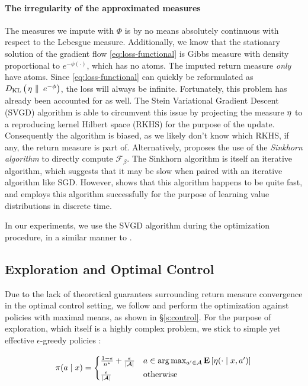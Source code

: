 \paragraph{The irregularity of the approximated measures}
The measures we impute with $\Phi$ is by no means absolutely
continuous with respect to the Lebesgue measure. Additionally, we know
that the stationary solution of the gradient flow
\eqref{eq:loss-functional} is Gibbs measure with density proportional
to $e^{-\phi(\cdot)}$, which has no atoms. The imputed return measure
\emph{only} have atoms. Since \eqref{eq:loss-functional} can quickly
be reformulated as $D_{\text{KL}}\left(\left. \operatorname{\eta}\ \right\|\ e^{-\phi}\right)$, the loss will
always be infinite. Fortunately, this problem has already been
accounted for as well. The Stein Variational Gradient Descent (SVGD)
algorithm \citep{liu2019stein} is able to circumvent this issue by
projecting the measure $\operatorname{\eta}$ to a reproducing kernel
Hilbert space (RKHS) for the purpose of the update. Consequently the
algorithm is biased, as we likely don't know which RKHS, if any, the
return measure is part of. Alternatively, \citet{cuturi2013sinkhorn}
proposes the use of the \emph{Sinkhorn algorithm}
\citep{sinkhorn1967diagonal} to directly compute
$\mathscr{F}_\beta$. The Sinkhorn algorithm is itself an iterative
algorithm, which suggests that it may be slow when paired with an
iterative algorithm like SGD. However, \citet{cuturi2013sinkhorn}
shows that this algorithm happens to be quite fast, and
\citet{martin2020stochastically} employs this algorithm successfully
for the purpose of learning value distributions in discrete time.

In our experiments, we use the SVGD algorithm during the optimization
procedure, in a similar manner to \citet{Zhang2018PolicyOA}.

\subsection{Exploration and Optimal
  Control}\label{s:deicide:alg:optimal-control}
Due to the lack of theoretical guarantees surrounding return measure
convergence in the optimal control setting, we follow
\citet{Bellemare2017ADP, hessel2018rainbow} and perform the
optimization against policies with maximal means, as shown in
\S\ref{s:control}. For the purpose of exploration, which itself is a
highly complex problem, we stick to simple yet effective
$\epsilon$-greedy policies \citep{sutton2018reinforcement}:

\begin{equation}
  \label{eq:egreedy}
  \pi(a\mid x) =
  \begin{cases}
    \frac{1-\epsilon}{n^\star} + \frac{\epsilon}{|\mathcal{A}|} &
    a\in\arg\max_{a'\in\mathcal{A}}\underset{}{\mathbf{E}}\left[\operatorname{\eta}(\cdot\mid x,
      a')\right]\\
    \frac{\epsilon}{|\mathcal{A}|} & \text{otherwise}\\
  \end{cases}
\end{equation}

